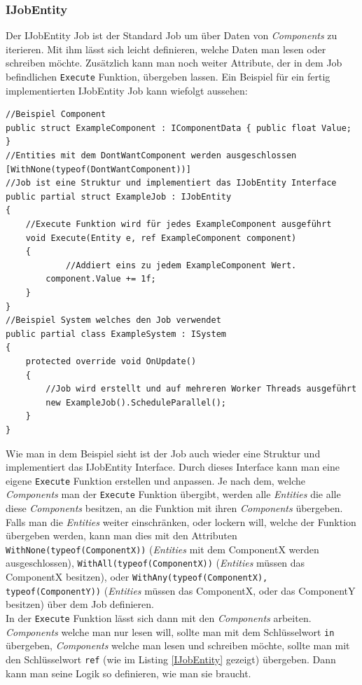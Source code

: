 \documentclass[12pt, titlepage]{article}
\DeclareRobustCommand{\#}{\adjustbox{valign=B,totalheight=.57\baselineskip}{\oldhash}}%
\begin{document}
\subsubsection{IJobEntity}
Der IJobEntity Job ist der Standard Job um über Daten von \textit{Components} zu iterieren. Mit ihm lässt sich leicht definieren, welche Daten man lesen oder schreiben möchte. Zusätzlich kann man noch weiter Attribute, der in dem Job befindlichen \texttt{Execute} Funktion, übergeben lassen. Ein Beispiel für ein fertig implementierten IJobEntity Job kann wiefolgt aussehen:
\begin{lstlisting}[style=code, caption={IJobEntity Beispiel}, label=IJobEntity]
//Beispiel Component
public struct ExampleComponent : IComponentData { public float Value; }
//Entities mit dem DontWantComponent werden ausgeschlossen
[WithNone(typeof(DontWantComponent))]
//Job ist eine Struktur und implementiert das IJobEntity Interface
public partial struct ExampleJob : IJobEntity
{
	//Execute Funktion wird für jedes ExampleComponent ausgeführt
    void Execute(Entity e, ref ExampleComponent component)
    {
    		//Addiert eins zu jedem ExampleComponent Wert.
        component.Value += 1f;
    }
}
//Beispiel System welches den Job verwendet
public partial class ExampleSystem : ISystem
{
    protected override void OnUpdate()
    {
        //Job wird erstellt und auf mehreren Worker Threads ausgeführt
        new ExampleJob().ScheduleParallel();
    }
}
\end{lstlisting}
Wie man in dem Beispiel sieht ist der Job auch wieder eine Struktur und implementiert das IJobEntity Interface. Durch dieses Interface kann man eine eigene \texttt{Execute} Funktion erstellen und anpassen. Je nach dem, welche \textit{Components} man der \texttt{Execute} Funktion übergibt, werden alle \textit{Entities} die alle diese  \textit{Components} besitzen, an die Funktion mit ihren \textit{Components} übergeben. Falls man die \textit{Entities} weiter einschränken, oder lockern will, welche der Funktion übergeben werden, kann man dies mit den Attributen \texttt{WithNone(typeof(ComponentX))} (\textit{Entities} mit dem ComponentX werden ausgeschlossen), \texttt{WithAll(typeof(ComponentX))} (\textit{Entities} müssen das ComponentX besitzen), oder \texttt{WithAny(typeof(ComponentX), typeof(ComponentY))} (\textit{Entities} müssen das ComponentX, oder das ComponentY besitzen) über dem Job definieren.\\
In der \texttt{Execute} Funktion lässt sich dann mit den \textit{Components} arbeiten. \textit{Components} welche man nur lesen will, sollte man mit dem Schlüsselwort \texttt{in} übergeben, \textit{Components} welche man lesen und schreiben möchte, sollte man mit den Schlüsselwort \texttt{ref} (wie im Listing \ref{IJobEntity} gezeigt) übergeben. Dann kann man seine Logik so definieren, wie man sie braucht.
\end{document}
